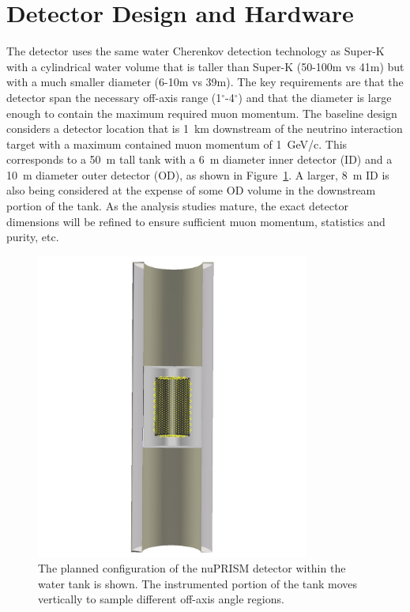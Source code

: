 \section{Detector Design and Hardware}\label{sec:detector}


The \nuprism detector uses the same water Cherenkov detection technology as Super-K with a cylindrical water volume that is taller than Super-K (50-100m vs 41m) but with a much smaller diameter (6-10m vs 39m). The key requirements are that the detector span the necessary off-axis range (1$^\circ$-4$^\circ$) and that the diameter is large enough to contain the maximum required muon momentum. The baseline design considers a detector location that is 1~km downstream of the neutrino interaction target with a maximum contained muon momentum of 1~GeV/c. This corresponds to a 50~m tall tank with a 6~m diameter inner detector (ID) and a 10~m diameter outer detector (OD), as shown in Figure~\ref{fig:nuprismpic}. A larger, 8~m ID is also being considered at the expense of some OD volume in the downstream portion of the tank. As the \nuprism analysis studies mature, the exact detector dimensions will be refined to ensure sufficient muon momentum, \nue statistics and purity, etc.

\begin{figure}[htbp]
\centering\includegraphics[width=9cm,angle=0]{figures/nuprism-middlecut.png}
\caption{The planned configuration of the nuPRISM detector within the water tank is shown. The instrumented portion of the tank moves vertically to sample different off-axis angle regions.}
\label{fig:nuprismpic} 
\end{figure}

